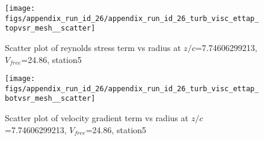 \begin{figure}[H]
\centering
\texttt{[image: figs/appendix\_run\_id\_26/appendix\_run\_id\_26\_turb\_visc\_ettap\_topvsr\_mesh\_\_scatter]}
\caption{Scatter plot of reynolds stress term vs radius at $z/c$=7.74606299213, $V_{free}$=24.86, station5}
\label{fig:appendix_run_id_26_turb_visc_ettap_topvsr_mesh__scatter}
\end{figure}


\begin{figure}[H]
\centering
\texttt{[image: figs/appendix\_run\_id\_26/appendix\_run\_id\_26\_turb\_visc\_ettap\_botvsr\_mesh\_\_scatter]}
\caption{Scatter plot of velocity gradient term vs radius at $z/c$=7.74606299213, $V_{free}$=24.86, station5}
\label{fig:appendix_run_id_26_turb_visc_ettap_botvsr_mesh__scatter}
\end{figure}


